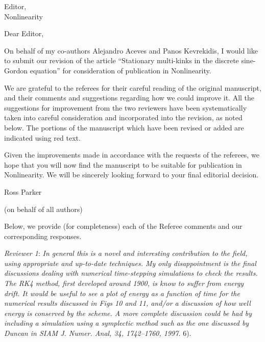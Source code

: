 \documentclass[11pt]{letter}
\begin{document}
\address{Ross Parker \\
Department of Mathematics \\
Southern Methodist University \\
Dallas, TX 75275 \\
\texttt{rhparker@smu.edu}}%
\signature{Ross Parker}
\begin{letter}{Editor, \\
Nonlinearity}

\opening{Dear Editor,}

On behalf of my co-authors Alejandro Aceves and Panos Kevrekidis, I would like to submit our revision of the article ``Stationary multi-kinks in the discrete sine-Gordon equation'' for consideration of publication in Nonlinearity. 

We are grateful to the referees for their careful reading of the original manuscript, and their comments and suggestions regarding how we could improve it. All the suggestions for improvement from the two reviewers have been systematically taken into careful consideration and incorporated into the revision, as noted below. The portions of the manuscript which have been revised or added are indicated using red text. 

Given the improvements made in accordance with the requests of the referees, we hope that you will now find the manuscript to be suitable for publication in Nonlinearity. We will be sincerely looking forward to your final editorial decision.

\begin{flushright}
Ross Parker

(on behalf of all authors)
\end{flushright}

\vspace{5mm}
Below, we provide (for completeness) each of the Referee
comments and our corresponding responses.
\vspace{5mm}

{\it Reviewer 1}: \emph{In general this is a novel and interesting contribution to the field, using appropriate and up-to-date techniques. My only disappointment is the final discussions dealing with numerical time-stepping simulations to check the results.  The RK4 method, first developed around 1900, is know to suffer from energy drift.  It would be useful to see a plot of energy as a function of time for the numerical results discussed in Figs 10 and 11, and/or a discussion of how well energy is conserved by the scheme.  A more complete discussion could be had by including a simulation using a symplectic method such as the one discussed by Duncan in SIAM J. Numer. Anal, 34, 1742–1760, 1997.} 6). 


\end{letter}
\end{document}
